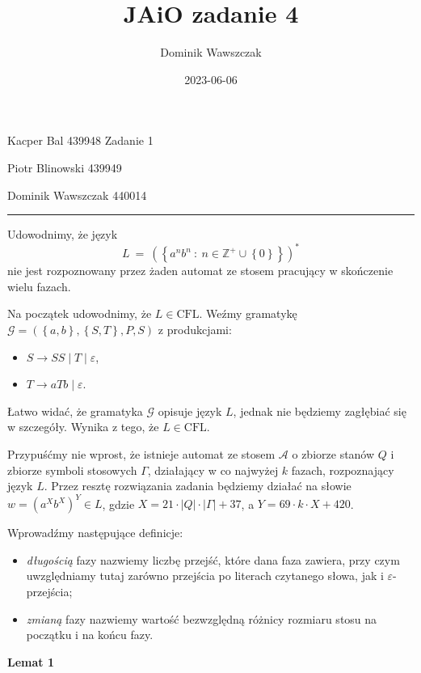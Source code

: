 \documentclass[12pt]{article}
\title{JAiO zadanie 4}
\author{Dominik Wawszczak}
\date{2023-06-06}
\begin{document}
	\setlength{\parindent}{0 cm}
	
	Kacper Bal 439948 \hfill Zadanie 1
	
	Piotr Blinowski 439949
	
	Dominik Wawszczak 440014
	
	\bigskip
	\hrule
	\bigskip
	
	Udowodnimy, że język
	\[ L \ = \ \left( \left\{ a^{n} b^{n} \ : \ n \in \mathbb{Z}^{+} \cup
	\left\{ 0 \right\} \right\} \right) ^ {\ast} \]
	nie jest rozpoznowany przez żaden automat ze stosem pracujący w skończenie
	wielu fazach.
	
	\medskip
	
	Na początek udowodnimy, że \(L \in \text{CFL}\). Weźmy gramatykę
	\(\mathcal{G} = \left( \left\{ a, b \right\}, \left\{ S, T \right\}, P, S
	\right)\) z produkcjami:
	\begin{itemize}
		\item \(S \longrightarrow SS \mid T \mid \varepsilon\),
		\item \(T \longrightarrow aTb \mid \varepsilon\).
	\end{itemize}
	Łatwo widać, że gramatyka \(\mathcal{G}\) opisuje język \(L\), jednak nie
	będziemy zagłębiać się w szczegóły. Wynika z tego, że \(L \in \text{CFL}\).
	
	\medskip
	
	Przypuśćmy nie wprost, że istnieje automat ze stosem \(\mathcal{A}\) o
	zbiorze stanów \(Q\) i zbiorze symboli stosowych \(\Gamma\), działający w co
	najwyżej \(k\) fazach, rozpoznający język \(L\). Przez resztę rozwiązania
	zadania będziemy działać na słowie \(w = \left( a^{X} b^{X} \right) ^ {Y}
	\in L\), gdzie \(X = 21 \cdot \left| Q \right| \cdot \left| \Gamma \right| +
	37\), a \(Y = 69 \cdot k \cdot X + 420\).
	
	\medskip
	
	Wprowadźmy następujące definicje:
	\begin{itemize}
		\item \textit{długością} fazy nazwiemy liczbę przejść, które dana faza
		      zawiera, przy czym uwzględniamy tutaj zarówno przejścia po
		      literach czytanego słowa, jak i \(\varepsilon\)-przejścia;
		\item \textit{zmianą} fazy nazwiemy wartość bezwzględną różnicy rozmiaru
		      stosu na początku i na końcu fazy.
	\end{itemize}
	
	\medskip
	
	\textbf{Lemat 1}
	
\end{document}
